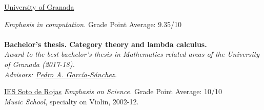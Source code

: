 \documentclass[nocolors]{friggeri-cv-a4}
\begin{document}
\begin{entrylist}
{\href{http://www.ugr.es/en/}{University of Granada}}
{\emph{Emphasis in computation.} Grade Point Average: 9.35/10 \\ \\
  { \textbf{Bachelor's thesis. Category theory and lambda calculus.} \\
    \emph{Award to the best bachelor's thesis in Mathematics-related areas of the University of Granada (2017-18). \\
    Advisors: \href{https://scholar.google.es/citations?user=gvq9UmMAAAAJ&hl=en&oi=ao}{Pedro A. García-Sánchez}.}
  }
  
} 

{\href{http://www.juntadeandalucia.es/averroes/centros-tic/18700037/helvia/sitio/}{IES Soto de Rojas}}
{\emph{Emphasis on Science.} Grade Point Average: 10/10 \\
  { \emph{Music School}, specialty on Violin, 2002-12.
  } 
}


\end{entrylist}
\end{document}
